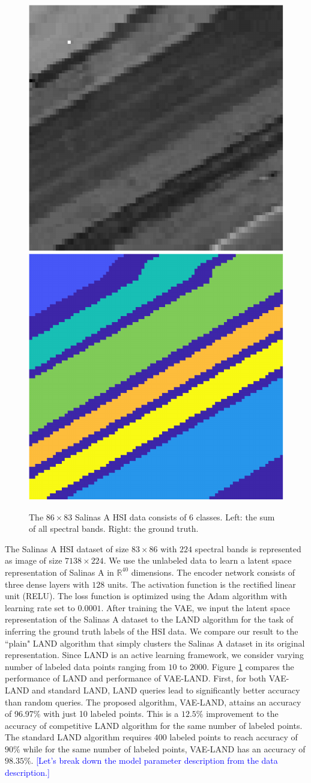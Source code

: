 \documentclass{article}
\def\R{{\mathbb R}}
\newcommand{\JMM}[1]{{\textcolor{blue}{[#1]}}}
\begin{document}
\begin{figure}[htb]
\includegraphics[width=.23\textwidth,clip]{Images/SalinasA_BandSum-crop.pdf}
\includegraphics[width=.23\textwidth,clip]{Images/SalinasA_GT-crop.pdf}
\caption{\small{The $86\times 83$ Salinas A HSI data consists of 6 classes.  Left: the sum of all spectral bands.  Right: the ground truth.}}
\label{fig:SalinasA}
\end{figure}
The Salinas A HSI dataset of size $83 \times 86$ with $224$ spectral bands is represented as image of size $7138\times 224$. We use the unlabeled data to learn a latent space representation of Salinas A in $\R^{40}$ dimensions. The encoder network consists of three dense layers with $128$ units. The activation function is the rectified linear unit (RELU). The loss function is optimized using the Adam algorithm with learning rate set to $0.0001$. After training the VAE, we input the latent space representation of the Salinas A dataset to the LAND algorithm for the task of inferring the ground truth labels of the HSI data. We compare our result to the ``plain" LAND algorithm that simply clusters the Salinas A dataset in its original representation. Since LAND is an active learning framework, we consider varying number of labeled data points ranging from $10$ to $2000$. Figure \ref{fig:SalinasA} compares the performance of LAND and performance of VAE-LAND. First, for both VAE-LAND and standard LAND, LAND queries lead to significantly better accuracy than random queries. The proposed algorithm, VAE-LAND, attains an accuracy of 96.97\% with just 10 labeled points. This is a $12.5\%$ improvement to the accuracy of competitive LAND algorithm for the same number of labeled points. The standard LAND algorithm requires $400$ labeled points to reach accuracy of $90\%$ while for the same number of labeled points, VAE-LAND has an accuracy of $98.35\%$.  \JMM{Let's break down the model parameter description from the data description.} 
\end{document}
